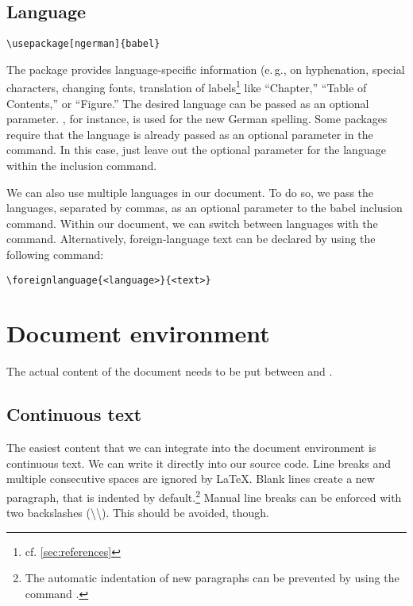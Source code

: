 \subsection{Language}\label{sec:language}
\begin{verbatim}
\usepackage[ngerman]{babel}
\end{verbatim}
The package  provides language-specific information (e.\,g., on hyphenation, special characters, changing fonts, translation of labels\footnote{cf. \cref{sec:references}} like \enquote{Chapter,} \enquote{Table of Contents,} or \enquote{Figure.}
The desired language can be passed as an optional parameter. 
, for instance, is used for the new German spelling. 
Some packages require that the language is already passed as an optional parameter in the  command. 
In this case, just leave out the optional parameter for the language within the  inclusion command.

We can also use multiple languages in our document. 
To do so, we pass the languages, separated by commas, as an optional parameter to the babel inclusion command. 
Within our document, we can switch between languages with the  command. 
Alternatively, foreign-language text can be declared by using the following command: 

\begin{verbatim}
\foreignlanguage{<language>}{<text>}
\end{verbatim}

\section{Document environment}
The actual content of the  document needs to be put between  and .

\subsection{Continuous text}
The easiest content that we can integrate into the document environment is continuous text. 
We can write it directly into our source code. 
Line breaks and multiple consecutive spaces are ignored by \LaTeX{}. 
Blank lines create a new paragraph, that is indented by default.\footnote{The automatic indentation of new paragraphs can be prevented by using the command .}
Manual line breaks can be enforced with two backslashes (\textbackslash\textbackslash). 
This should be avoided, though. 

